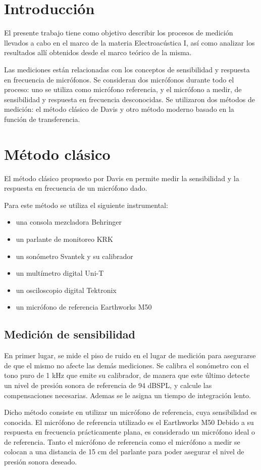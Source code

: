 \documentclass[]{article}
\begin{document}
\begin{multicols}{2}
\section{Introducción}
El presente trabajo tiene como objetivo describir los procesos de medición
llevados a cabo en el marco de la materia Electroacústica I, así como analizar
los resultados allí obtenidos desde el marco teórico de la misma.

Las mediciones están relacionadas con los conceptos de sensibilidad y respuesta
 en frecuencia de micrófonos. Se consideran dos micrófonos durante todo el
proceso: uno se utiliza como micrófono referencia, y el micrófono a medir, de
sensibilidad y respuesta en frecuencia desconocidas. Se utilizaron dos métodos
de medición: el método clásico de Davis y otro método moderno basado en la
función de transferencia.
\section{Método clásico}
El método clásico propuesto por Davis en \cite{davis} permite medir
la sensibilidad y la respuesta en frecuencia de un micrófono dado.

Para este método se utiliza el siguiente instrumental:
\begin{itemize}
\item una consola mezcladora Behringer
\item un parlante de monitoreo KRK
\item un sonómetro Svantek y su calibrador
\item un multímetro digital Uni-T
\item un osciloscopio digital Tektronix
\item un micrófono de referencia Earthworks M50
\end{itemize}

\subsection{Medición de sensibilidad}
En primer lugar, se mide el piso de ruido en el lugar de medición para asegurarse
de que el mismo no afecte las demás mediciones. Se calibra el sonómetro con el
tono puro de 1 kHz que emite su calibrador, de manera que este último detecte un
nivel de presión sonora de referencia de 94 dBSPL, y calcule las compensaciones
necesarias. Ademas se le asigna un tiempo de integración lento.

Dicho método consiste en utilizar un micrófono de referencia, cuya sensibilidad
es conocida. El micrófono de referencia utilizado es el Earthworks M50
Debido a su respuesta en frecuencia prácticamente plana, es considerado un
micrófono ideal o de referencia. Tanto el micrófono de referencia como el
micrófono a medir se colocan a una distancia de 15 cm del parlante para poder
asegurar el nivel de presión sonora deseado.


\end{multicols}
\end{document}
